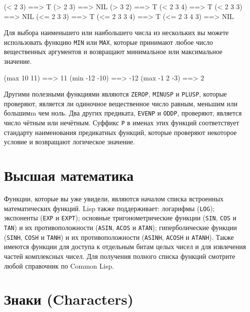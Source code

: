 \begin{myverb}
  (< 2 3)       ==> T
  (> 2 3)       ==> NIL
  (> 3 2)       ==> T
  (< 2 3 4)     ==> T
  (< 2 3 3)     ==> NIL
  (<= 2 3 3)    ==> T
  (<= 2 3 3 4)  ==> T
  (<= 2 3 4 3)  ==> NIL
\end{myverb}

Для выбора наименьшего или наибольшего числа из нескольких вы можете использовать функцию
\lstinline{MIN} или \lstinline{MAX}, которые принимают любое число вещественных аргументов и
возвращают минимальное или максимальное значение.

\begin{myverb}
  (max 10 11)    ==> 11
  (min -12 -10)  ==> -12
  (max -1 2 -3)  ==> 2
\end{myverb}

Другими полезными функциями являются \lstinline{ZEROP}, \lstinline{MINUSP} и \lstinline{PLUSP}, которые
проверяют, является ли одиночное вещественное число равным, меньшим или большимm чем ноль.
Два других предиката, \lstinline{EVENP} и \lstinline{ODDP}, проверяют, является число чётным или
нечётным.  Суффикс \lstinline{P} в именах этих функций соответствует стандарту наименования
предикатных функций, которые проверяют некоторое условие и возвращают логическое значение.

\section{Высшая математика}

Функции, которые вы уже увидели, являются началом списка встроенных математических
функций. Lisp также поддерживает: логарифмы (\lstinline{LOG}); экспоненты (\lstinline{EXP} и
\lstinline{EXPT}); основные тригонометрические функции (\lstinline{SIN}, \lstinline{COS} и \lstinline{TAN}) и
их противоположности (\lstinline{ASIN}, \lstinline{ACOS} и \lstinline{ATAN}); гиперболические функции
(\lstinline{SINH}, \lstinline{COSH} и \lstinline{TANH}) и их противоположности (\lstinline{ASINH},
\lstinline{ACOSH} и \lstinline{ATANH}).  Также имеются функции для доступа к отдельным битам целых
чисел и для извлечения частей комплексных чисел.  Для получения полного списка функций
смотрите любой справочник по Common Lisp.

\section{Знаки (Characters)}

